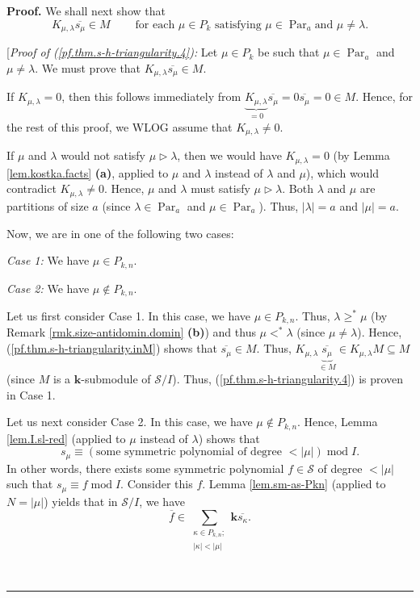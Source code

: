 \documentclass[numbers=enddot,12pt,final,onecolumn,notitlepage]{scrartcl}%
\theoremstyle{definition}
\newenvironment{proof}[1][Proof]{\noindent\textbf{#1.} }{\ \rule{0.5em}{0.5em}}
\let\sumnonlimits\sum
\renewcommand{\sum}{\sumnonlimits\limits}
\begin{document}
\begin{proof}
We shall next show that%
\begin{equation}
K_{\mu,\lambda}\overline{s_{\mu}}\in M\ \ \ \ \ \ \ \ \ \ \text{for each }%
\mu\in P_{k}\text{ satisfying }\mu\in\operatorname*{Par}\nolimits_{a}\text{
and }\mu\neq\lambda. \label{pf.thm.s-h-triangularity.4}%
\end{equation}


[\textit{Proof of (\ref{pf.thm.s-h-triangularity.4}):} Let $\mu\in P_{k}$ be
such that $\mu\in\operatorname*{Par}\nolimits_{a}$ and $\mu\neq\lambda$. We
must prove that $K_{\mu,\lambda}\overline{s_{\mu}}\in M$.

If $K_{\mu,\lambda}=0$, then this follows immediately from $\underbrace{K_{\mu
,\lambda}}_{=0}\overline{s_{\mu}}=0\overline{s_{\mu}}=0\in M$. Hence, for the
rest of this proof, we WLOG assume that $K_{\mu,\lambda}\neq0$.

If $\mu$ and $\lambda$ would not satisfy $\mu\triangleright\lambda$, then we
would have $K_{\mu,\lambda}=0$ (by Lemma \ref{lem.kostka.facts} \textbf{(a)},
applied to $\mu$ and $\lambda$ instead of $\lambda$ and $\mu$), which would
contradict $K_{\mu,\lambda}\neq0$. Hence, $\mu$ and $\lambda$ must satisfy
$\mu\triangleright\lambda$. Both $\lambda$ and $\mu$ are partitions of size
$a$ (since $\lambda\in\operatorname*{Par}\nolimits_{a}$ and $\mu
\in\operatorname*{Par}\nolimits_{a}$). Thus, $\left\vert \lambda\right\vert
=a$ and $\left\vert \mu\right\vert =a$.

Now, we are in one of the following two cases:

\textit{Case 1:} We have $\mu\in P_{k,n}$.

\textit{Case 2:} We have $\mu\notin P_{k,n}$.

Let us first consider Case 1. In this case, we have $\mu\in P_{k,n}$. Thus,
$\lambda\geq^{\ast}\mu$ (by Remark \ref{rmk.size-antidomin.domin}
\textbf{(b)}) and thus $\mu<^{\ast}\lambda$ (since $\mu\neq\lambda$). Hence,
(\ref{pf.thm.s-h-triangularity.inM}) shows that $\overline{s_{\mu}}\in M$.
Thus, $K_{\mu,\lambda}\underbrace{\overline{s_{\mu}}}_{\in M}\in
K_{\mu,\lambda}M\subseteq M$ (since $M$ is a $\mathbf{k}$-submodule of
$\mathcal{S}/I$). Thus, (\ref{pf.thm.s-h-triangularity.4}) is proven in Case 1.

Let us next consider Case 2. In this case, we have $\mu\notin P_{k,n}$. Hence,
Lemma \ref{lem.I.sl-red} (applied to $\mu$ instead of $\lambda$) shows that%
\[
s_{\mu}\equiv\left(  \text{some symmetric polynomial of degree }<\left\vert
\mu\right\vert \right)  \operatorname{mod}I.
\]
In other words, there exists some symmetric polynomial $f\in\mathcal{S}$ of
degree $<\left\vert \mu\right\vert $ such that $s_{\mu}\equiv
f\operatorname{mod}I$. Consider this $f$. Lemma \ref{lem.sm-as-Pkn} (applied
to $N=\left\vert \mu\right\vert $) yields that in $\mathcal{S}/I$, we have
\begin{equation}
\overline{f}\in\sum_{\substack{\kappa\in P_{k,n};\\\left\vert \kappa
\right\vert <\left\vert \mu\right\vert }}\mathbf{k}\overline{s_{\kappa}}.
\label{pf.thm.s-h-triangularity.4.pf.c2.5}%
\end{equation}



\end{proof}
\end{document}
